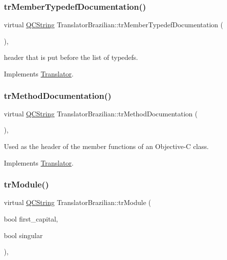 \subsubsection{\texorpdfstring{trMemberTypedefDocumentation()}{trMemberTypedefDocumentation()}}
{\footnotesize\ttfamily virtual \mbox{\hyperlink{class_q_c_string}{Q\+C\+String}} Translator\+Brazilian\+::tr\+Member\+Typedef\+Documentation (\begin{DoxyParamCaption}{ }\end{DoxyParamCaption})\hspace{0.3cm}{\ttfamily [inline]}, {\ttfamily [virtual]}}

header that is put before the list of typedefs. 

Implements \mbox{\hyperlink{class_translator}{Translator}}.

\mbox{\label{class_translator_brazilian_a30a9731a9f5f8bf9cddeca4db003cfe2}} 
\subsubsection{\texorpdfstring{trMethodDocumentation()}{trMethodDocumentation()}}
{\footnotesize\ttfamily virtual \mbox{\hyperlink{class_q_c_string}{Q\+C\+String}} Translator\+Brazilian\+::tr\+Method\+Documentation (\begin{DoxyParamCaption}{ }\end{DoxyParamCaption})\hspace{0.3cm}{\ttfamily [inline]}, {\ttfamily [virtual]}}

Used as the header of the member functions of an Objective-\/C class. 

Implements \mbox{\hyperlink{class_translator}{Translator}}.

\mbox{\label{class_translator_brazilian_a7fa3ba16eed6216871a3bc80efd986c5}} 
\subsubsection{\texorpdfstring{trModule()}{trModule()}}
{\footnotesize\ttfamily virtual \mbox{\hyperlink{class_q_c_string}{Q\+C\+String}} Translator\+Brazilian\+::tr\+Module (\begin{DoxyParamCaption}\item[{bool}]{first\+\_\+capital,  }\item[{bool}]{singular }\end{DoxyParamCaption})\hspace{0.3cm}{\ttfamily [inline]}, {\ttfamily [virtual]}}

